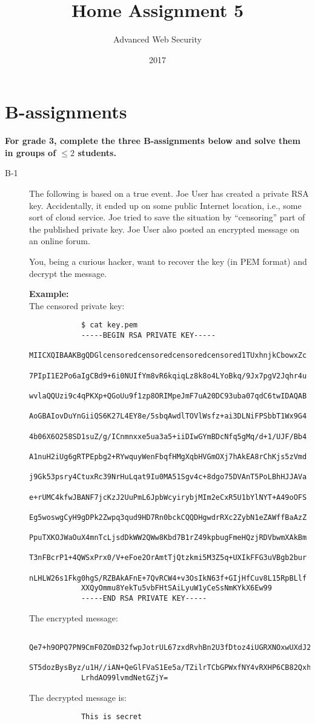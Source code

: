 \documentclass{article}
\begin{document}
	
	\title{Home Assignment 5}
	\author{Advanced Web Security}
	\date{2017}
	
	\maketitle
	
	\section*{B-assignments}
	\textbf{For grade 3, complete the three B-assignments below and solve them in groups of $\leq 2$ students.}
	
	\begin{description}
		
		\item[B-1]{The following is based on a true event. Joe User has created a private RSA key. Accidentally, it ended up on some public Internet location, i.e., some sort of cloud service. Joe tried to save the situation by ``censoring'' part of the published private key.
			Joe User also posted an encrypted message on an online forum.
			
			You, being a curious hacker, want to recover the key (in PEM format) and decrypt the message.
			
			\textbf{Example:}\\
			The censored private key:
			\begin{verbatim}
			$ cat key.pem
			-----BEGIN RSA PRIVATE KEY-----
			MIICXQIBAAKBgQDGlcensoredcensoredcensoredcensored1TUxhnjkCbowxZc
			7PIpI1E2Po6aIgCBd9+6i0NUIfYm8vR6kqiqLz8k8o4LYoBkq/9Jx7pgV2Jqhr4u
			wvlaQQUzi9c4qPKXp+QGoUu9f1zp8ORIMpeJmF7uA20DC93uba07qdC6twIDAQAB
			AoGBAIovDuYnGiiQS6K27L4EY8e/5sbqAwdlTOVlWsfz+ai3DLNiFPSbbT1Wx9G4
			4b06X6O258SD1suZ/g/ICnmnxxe5ua3a5+iiDIwGYmBDcNfq5gMq/d+1/UJF/Bb4
			A1nuH2iUg6gRTPEpbg2+RYwquyWenFbqfHMgXqbHVGmOXj7hAkEA8rChKjs5zVmd
			j9Gk53psry4CtuxRc39NrHuLqat9Iu0MA51Sgv4c+8dgo75DVAnT5PoLBhHJJAVa
			e+rUMC4kfwJBANF7jcKzJ2UuPmL6JpbWcyirybjMIm2eCxR5U1bYlNYT+A49oOFS
			Eg5woswgCyH9gDPk2Zwpq3qud9HD7Rn0bckCQQDHgwdrRXc2ZybN1eZAWffBaAzZ
			PpuTXKOJWaOuX4mnTcLjsdDkWW2QWw8Kbd7B1rZ49kpbugFmeHQzjRDVbwmXAkBm
			T3nFBcrP1+4QWSxPrx0/V+eFoe2OrAmtTjQtzkmi5M3Z5q+UXIkFFG3uVBgb2bur
			nLHLW26s1Fkg0hgS/RZBAkAFnE+7QvRCW4+v3OsIkN63f+GIjHfCuv8L15RpBLlf
			XXQyOmmu8YekTu5vbFHtSAiLyuW1yCeSsNmKYkX6Ew99
			-----END RSA PRIVATE KEY-----
			\end{verbatim}	
			The encrypted message:
			\begin{verbatim}
			Qe7+h9OPQ7PN9CmF0ZOmD32fwpJotrUL67zxdRvhBn2U3fDtoz4iUGRXNOxwUXdJ2Cmz7zjS0DE8
			ST5dozBysByz/u1H//iAN+QeGlFVaS1Ee5a/TZilrTCbGPWxfNY4vRXHP6CB82QxhMjQ7/x90/+J
			LrhdAO99lvmdNetGZjY=
			\end{verbatim}
			The decrypted message is:
			\begin{verbatim}
			This is secret
			\end{verbatim}

}
\end{description}
\end{document}
